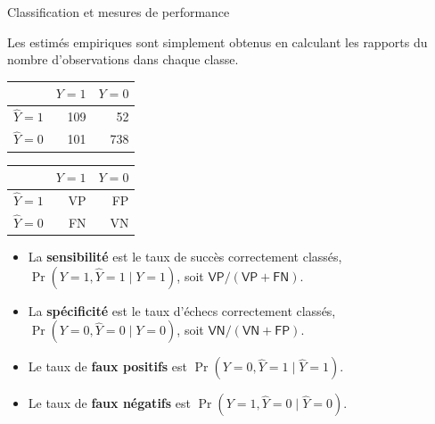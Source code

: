 \documentclass[
  ignorenonframetext,
]{beamer}
\providecommand{\tightlist}{%
  \setlength{\itemsep}{0pt}\setlength{\parskip}{0pt}}\usepackage{longtable,booktabs,array}
\begin{document}
\begin{frame}{Classification et mesures de performance}
\protect\hypertarget{classification-et-mesures-de-performance}{}
\footnotesize

Les estimés empiriques sont simplement obtenus en calculant les rapports
du nombre d'observations dans chaque classe.

\normalsize

\begin{table}

\begin{tabular}{lrr}
\toprule
  & \(Y=1\) & \(Y=0\)\\
\midrule
\(\widehat{Y}=1\) & 109 & 52\\
\(\widehat{Y}=0\) & 101 & 738\\
\bottomrule
\end{tabular}
\begin{tabular}{lrr}
\toprule
  & \(Y=1\) & \(Y=0\)\\
\midrule
\(\widehat{Y}=1\) & VP & FP\\
\(\widehat{Y}=0\) & FN & VN\\
\bottomrule
\end{tabular}
\end{table}

\begin{itemize}
\tightlist
\item
  La \textbf{sensibilité} est le taux de succès correctement classés,
  \(\Pr(Y=1, \widehat{Y}=1 \mid Y=1)\), soit
  \(\mathsf{VP}/(\mathsf{VP}+\mathsf{FN})\).
\item
  La \textbf{spécificité} est le taux d'échecs correctement classés,
  \(\Pr(Y=0, \widehat{Y}=0 \mid Y=0)\), soit
  \(\mathsf{VN}/(\mathsf{VN}+\mathsf{FP})\).
\item
  Le taux de \textbf{faux positifs} est
  \(\Pr(Y=0, \widehat{Y}=1 \mid \widehat{Y}=1)\).
\item
  Le taux de \textbf{faux négatifs} est
  \(\Pr(Y=1, \widehat{Y}=0 \mid \widehat{Y}=0)\).
\end{itemize}
\end{frame}
\end{document}
